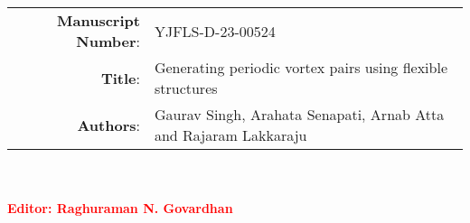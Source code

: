 \documentclass[onecolumn,a4paper,amsmath,amssym,pre]{revtex4}
\begin{document}
    

\begin{tabular}{ r | l }
  \hline            
   \textbf{Manuscript Number}:& YJFLS-D-23-00524 \\	
   \textbf{Title}: & Generating periodic vortex pairs using flexible structures\\
  \textbf{Authors}:  & Gaurav Singh, Arahata Senapati, Arnab Atta and Rajaram Lakkaraju \\
  \hline  
\end{tabular}\\ \\


	\textcolor{red}{\textbf{Editor: Raghuraman N. Govardhan}}\\
	
\end{document}
